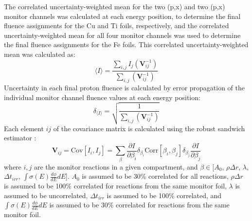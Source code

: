 % 
The correlated uncertainty-weighted mean  for the two (p,x) and two (p,x) monitor channels was calculated at each energy position, to determine the final fluence assignments for the Cu and Ti foils, respectively, and the correlated uncertainty-weighted mean  for all four monitor channels was used to determine the final fluence assignments for the Fe foils.
This correlated uncertainty-weighted mean was calculated as:
\begin{equation} \label{eq:weighted_average_beamcurrent}
    \langle I \rangle  = \frac{ \sum_{i,j} I_j  \left( \mathbf{V}^{-1}_{ij}  \right) }{\sum_{i,j}  \left( \mathbf{V}^{-1}_{ij}  \right)} 
\end{equation}
Uncertainty in each final proton fluence  is  calculated by error propagation of the individual monitor channel fluence values  at each energy position:
\begin{equation}
    \label{eq:corrWeight}
    \delta_{\langle I \rangle} = \sqrt{\frac{ 1}{\sum_{i,j}  \left( \mathbf{V}^{-1}_{ij}  \right)}} 
\end{equation}
Each element $ij$ of the covariance matrix is calculated using the robust
sandwich estimator  \cite{huber1967behavior}:
\begin{equation}
    \label{eq:Vij}
    \mathbf{V}_{ij} = \mathrm{Cov}[I_i, I_j] = \sum_{\beta} \frac{\partial I}{\partial \beta_i} \delta_{\beta_i} \mathrm{Corr}[\beta_i, \beta_j] \delta_{\beta_j} \frac{\partial I}{\partial \beta_j}
\end{equation}
where $i,j$ are the monitor reactions in a given compartment, and $\beta \in [A_0$, $\rho \Delta r$, $\lambda$, $\Delta t_{irr}$, $\int \sigma(E) \frac{d\phi}{dE}dE$]. 
$A_0$ is assumed to be 30\% correlated for all reactions, $\rho \Delta r$ is assumed to be 100\% correlated for reactions from the same monitor foil, $\lambda$ is assumed to be uncorrelated, $\Delta t_{irr}$ is assumed to be 100\% correlated, and $\int \sigma(E) \frac{d\phi}{dE}dE$ is assumed to be 30\% correlated for reactions from the same monitor foil.  

